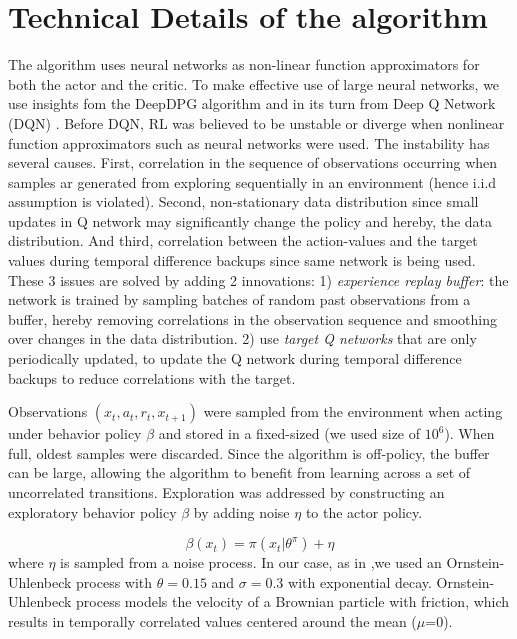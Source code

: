 \section{Technical Details of the algorithm} \label{sec:technical_details}
The algorithm uses neural networks as non-linear function approximators for both the actor and the critic.
To make effective use of large neural networks, we use insights fom the DeepDPG algorithm \cite{Lillicrap2016} and in its turn
from Deep Q Network (DQN) \citep{Mnih2015}.
Before DQN, RL was believed to be unstable or diverge when nonlinear function approximators such as neural networks were used.
The instability has several causes. First, correlation in the sequence of observations occurring when
samples ar generated from exploring sequentially in an environment (hence i.i.d assumption is violated).
Second, non-stationary data distribution since small updates in Q network may significantly change the policy and hereby, the data distribution.
And third, correlation between the action-values and the target values during temporal difference backups since same network is being used.
These 3 issues are solved by adding 2 innovations: 1)  \textit{experience replay buffer}: the network is trained by sampling 
batches of random past observations from a buffer, hereby removing correlations in the observation sequence and smoothing over
changes in the data distribution.
2) use \textit{target Q networks} that are only periodically updated, to update the Q network during temporal difference backups to reduce
correlations with the target.

Observations $(x_t,a_t,r_t,x_{t+1})$ were sampled from the environment when acting under behavior policy $\beta$ and stored
in a fixed-sized (we used size of $10^6$). When full, oldest samples were discarded.
Since the algorithm is off-policy, the buffer can be large, allowing the algorithm to benefit from
learning across a set of uncorrelated transitions.
Exploration was addressed by constructing an exploratory behavior policy $\beta$ by adding noise $\eta$ to the actor policy.

\begin{equation}
    \beta(x_t)=\pi(x_t| \theta^\pi) + \eta
\end{equation}
where $\eta$ is sampled from a noise process. In our case, as in \citet{Lillicrap2016},we
used an Ornstein-Uhlenbeck process \citep{Uhlenbeck1930} with $\theta = 0.15$ and $\sigma=0.3$ with exponential decay.
Ornstein-Uhlenbeck process models the velocity of a Brownian particle with friction, which results in temporally correlated
values centered around the mean ($\mu$=0). 

